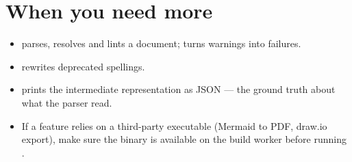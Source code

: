 \documentclass[a4paper,twoside]{article}
\begin{document}
\section{When you need more}
\begin{itemize}
\item {} parses, resolves and lints a document;  turns
warnings into failures.
\item {} rewrites deprecated spellings.
\item {} prints the intermediate representation as JSON --- the
ground truth about what the parser read.
\item If a feature relies on a third-party executable (Mermaid to PDF, draw.io
export), make sure the binary is available on the build worker before running
.
\end{itemize}
\end{document}
